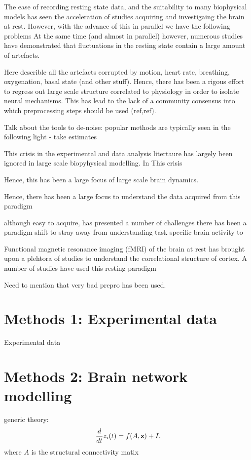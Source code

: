 \documentclass[oneside]{./zHenriquesLab-StyleBioRxiv}
\begin{document}
The ease of recording resting state data, and the suitability to many biophysical models has seen the acceleration of studies acquiring and investigaing the brain at rest.
However, with the advance of this in parallel we have the following problems
At the same time (and almost in parallel) however, numerous studies have demonstrated that fluctuations in the resting state contain a large amount of artefacts.

Here describle all the artefacts corrupted by motion, heart rate, breathing, oxygenation, basal state (and other stuff). Hence, there has been a rigous effort to regress out large scale structure correlated to physiology in order to isolate neural mechanisms. This has lead to the lack of a community consensus into which preprocessing steps should be used (ref,ref).

Talk about the tools to de-noise: popular methods are typically seen in the following light - take estimates 


This crisis in the experimental and data analysis litertaure has largely been ignored in large scale biopyhysical modelling. In This crisis


Hence, this has been a large focus of large scale brain dynamics. 

Hence, there has been a large focus to understand the data acquired from this paradigm 

 although easy to acquire, has presented a number of challenges there has been a paradigm shift to stray away from understanding task specific brain activity to 


Functional magnetic resonance imaging (fMRI) of the brain at rest has brought upon a plehtora of studies to understand the correlational structure of cortex. A number of studies have used this resting paradigm 


Need to mention that very bad prepro has been used. 

\section*{Methods 1: Experimental data}
Experimental data
\section*{Methods 2: Brain network modelling}
generic theory:
\begin{equation}
	\frac{d}{dt}z_{i}(t) = f(A,{\bf z}) + I.
\end{equation}
where $A$ is the structural connectivity matix 
\end{document}
